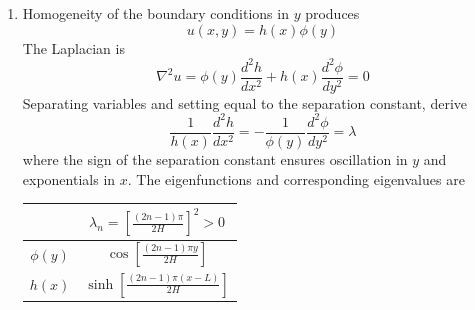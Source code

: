 \documentclass[a4paper]{article}
\begin{document}
\begin{enumerate}[label=(\alph*)]
\begin{center}
\begin{tabular}{|c||c|}
			 & \( \lambda_{n} = \displaystyle{\!\left( \frac{n \pi}{H} \right)^{2}} > 0 \) \\
			\hline\hline
			\rule[-1.2em]{0pt}{3em}
					\( \phi \!\left( y \right) \) & \( \displaystyle{\sin\!\left(\frac{n \pi y}{H}\right)} \) \\
			\hline
			\rule[-1.2em]{0pt}{3em}
					\( h \!\left( x \right) \) & \( \displaystyle{\cosh\!\left(\frac{n \pi x}{H}\right)} \) \\
			\hline
		\end{tabular}
	\end{center}
	By superposition, we have complete temperature distribution
	\[
		u \!\left( x,y \right) = \sum^{\infty}_{n=1} A_{n}\cosh\!\left(\frac{n \pi x}{H}\right)\sin\!\left(\frac{n \pi y}{H}\right) 
	\]
	where \( A_{n} \) is determined by evaluating at \( \!\left( L,y \right) \):
	\[
		u \!\left( L,y \right) = \sum^{\infty}_{n=1} A_{n}\cosh\!\left(\frac{n \pi L}{H}\right)\sin\!\left(\frac{n \pi y}{H}\right) = g \!\left( y \right)
	\]
	and then multiplying by \( \sin\!\left(m \pi y / H\right) \) and integrating from \( 0 \) to \( H \) to derive
	\[
		A_{m} = \frac{2}{H \cosh\!\left(m \pi L / H\right)}\int^{H}_{0} g \!\left( y \right)\sin\!\left(\frac{m \pi y}{H}\right) \, dy  
	\]
	\item Homogeneity of the boundary conditions in \( y \) produces
	\[
		u \!\left( x,y \right) = h \!\left( x \right)\phi \!\left( y \right) 
	\]
	The Laplacian is
	\[
		\nabla^{2}u = \phi \!\left( y \right)\frac{d^2 h}{d x^2} + h \!\left( x \right)\frac{d^2 \phi}{d y^2} = 0 
	\]
	Separating variables and setting equal to the separation constant, derive
	\[
		\frac{1}{h \!\left( x \right)}\frac{d^2 h}{d x^2} = -\frac{1}{\phi \!\left( y \right)}\frac{d^2 \phi}{d y^2} = \lambda 
	\]
	where the sign of the separation constant ensures oscillation in \( y \) and exponentials in \( x \). The eigenfunctions and corresponding eigenvalues are
	\begin{center}
		\renewcommand{\arraystretch}{1.8}
		\setlength{\arraycolsep}{10pt}
		\begin{tabular}{|c||c|}
			\hline
			\rule[-1.2em]{0pt}{3em}
			 & \( \lambda_{n} = \displaystyle{\!\left[ \frac{\!\left( 2n - 1 \right)\pi}{2H} \right]^{2}} > 0 \) \\
			\hline\hline
			\rule[-1.2em]{0pt}{3em}
			\( \phi \!\left( y \right) \) & \( \displaystyle{\cos\!\left[\frac{\!\left( 2n - 1 \right)\pi y}{2H}\right]} \) \\
			\hline
			\rule[-1.2em]{0pt}{3em}
			\( h \!\left( x \right) \) & \( \displaystyle{\sinh\!\left[\frac{\!\left( 2n - 1 \right)\pi \!\left( x - L \right)}{2H}\right]} \) \\

\end{tabular}
\end{center}
\end{enumerate}
\end{document}
